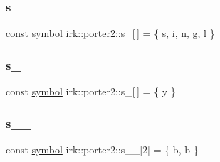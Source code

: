 \mbox{\label{namespaceirk_1_1porter2_a9de766311cf67203cbf3646243facc04}} 
\subsubsection{\texorpdfstring{s\+\_}{s\_38}}
{\footnotesize\ttfamily const \mbox{\hyperlink{namespaceirk_1_1porter2_afd04c4eb58a1dabcf8f3ab2d7e9f9ed5}{symbol}} irk\+::porter2\+::s\+\_\mbox{[}$\,$\mbox{]} = \{ \textquotesingle{}s\textquotesingle{}, \textquotesingle{}i\textquotesingle{}, \textquotesingle{}n\textquotesingle{}, \textquotesingle{}g\textquotesingle{}, \textquotesingle{}l\textquotesingle{} \}\hspace{0.3cm}{\ttfamily [static]}}

\mbox{\label{namespaceirk_1_1porter2_ab83203333101be8a0c2af7746e245819}} 
\subsubsection{\texorpdfstring{s\+\_}{s\_39}}
{\footnotesize\ttfamily const \mbox{\hyperlink{namespaceirk_1_1porter2_afd04c4eb58a1dabcf8f3ab2d7e9f9ed5}{symbol}} irk\+::porter2\+::s\+\_\mbox{[}$\,$\mbox{]} = \{ \textquotesingle{}y\textquotesingle{} \}\hspace{0.3cm}{\ttfamily [static]}}

\mbox{\label{namespaceirk_1_1porter2_a0a55fdd0621d13f2086b2abb5b76f7b4}} 
\subsubsection{\texorpdfstring{s\+\_\+\_}{s\_3\_1}}
{\footnotesize\ttfamily const \mbox{\hyperlink{namespaceirk_1_1porter2_afd04c4eb58a1dabcf8f3ab2d7e9f9ed5}{symbol}} irk\+::porter2\+::s\+\_\+\_\mbox{[}2\mbox{]} = \{ \textquotesingle{}b\textquotesingle{}, \textquotesingle{}b\textquotesingle{} \}\hspace{0.3cm}{\ttfamily [static]}}

